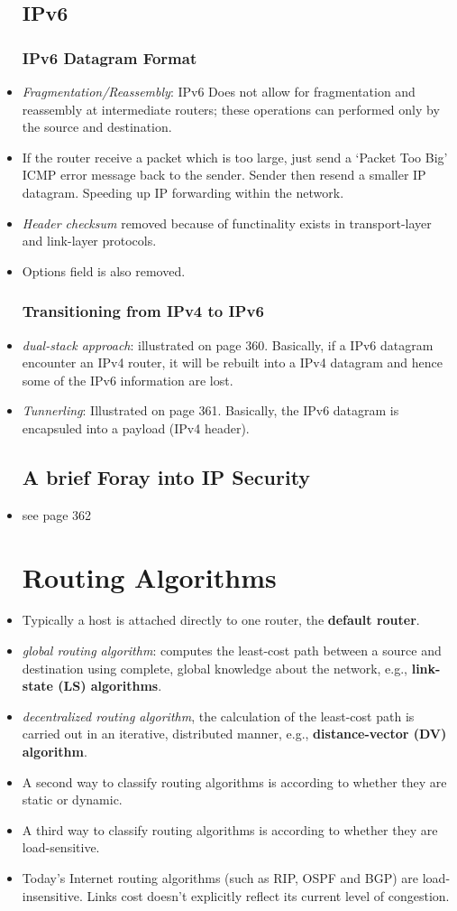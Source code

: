 \documentclass{article}
\begin{document}
\begin{itemize}
\subsection{IPv6}
\subsubsection*{IPv6 Datagram Format}
\item \emph{Fragmentation/Reassembly}: IPv6 Does not allow for
  fragmentation and reassembly at intermediate routers; these
  operations can performed only by the source and destination.
\item If the router receive a packet which is too large, just send a
  `Packet Too Big' ICMP error message back to the sender. Sender then
  resend a smaller IP datagram. Speeding up IP forwarding within the
  network.
\item \emph{Header checksum} removed because of functinality exists in
  transport-layer and link-layer protocols.
\item Options field is also removed.
\subsubsection*{Transitioning from IPv4 to IPv6}
\item \emph{dual-stack approach}: illustrated on page 360. Basically,
  if a IPv6 datagram encounter an IPv4 router, it will be rebuilt into
  a IPv4 datagram and hence some of the IPv6 information are lost.
\item \emph{Tunnerling}: Illustrated on page 361. Basically, the IPv6
  datagram is encapsuled into a payload (IPv4 header).
\subsection{A brief Foray into IP Security}
\item see page 362
\section{Routing Algorithms}
\item Typically a host is attached directly to one router, the
  \textbf{default router}.
\item \emph{global routing algorithm}: computes the least-cost path
  between a source and destination using complete, global knowledge
  about the network, e.g., \textbf{link-state (LS) algorithms}.
\item \emph{decentralized routing algorithm}, the calculation of the
  least-cost path is carried out in an iterative, distributed manner,
  e.g., \textbf{distance-vector (DV) algorithm}.
\item A second way to classify routing algorithms is according to
  whether they are static or dynamic.
\item A third way to classify routing algorithms is according to
  whether they are load-sensitive.
\item Today's Internet routing algorithms (such as RIP, OSPF and BGP)
  are load-insensitive. Links cost doesn't explicitly reflect its
  current level of congestion.

\end{itemize}
\end{document}
